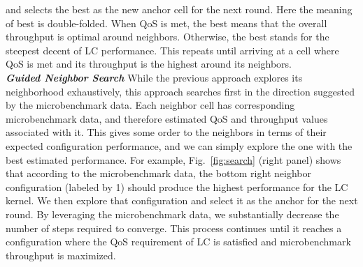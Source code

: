 and selects the best as the new anchor cell for the next round. Here the meaning of best is double-folded. When QoS is met, the best means that the overall throughput is optimal around neighbors. Otherwise, the best stands for the steepest decent of LC performance. This repeats until arriving at a cell where QoS is met and its throughput is the highest around its neighbors. \\
\textbf{\textit{Guided Neighbor Search}} %
While the previous approach explores its neighborhood exhaustively, this approach searches first in the direction suggested by the microbenchmark data. Each neighbor cell has corresponding microbenchmark data, and therefore estimated QoS and throughput values associated with it. This gives some order to the neighbors in terms of their expected configuration performance, and we can simply explore the one with the best estimated performance. For example, Fig.~\ref{fig:search} (right panel) shows that according to the microbenchmark data, the bottom right neighbor configuration (labeled by 1) should produce the highest performance for the LC kernel. We then explore that configuration and select it as the anchor for the next round. By leveraging the microbenchmark data, we substantially decrease the number of steps required to converge. This process continues until it reaches a configuration where the QoS requirement of LC is satisfied and microbenchmark throughput is maximized. %
